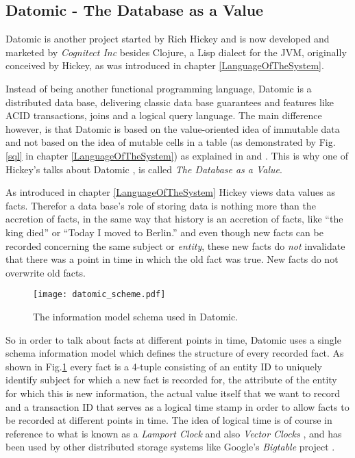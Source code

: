 \subsection{Datomic - The Database as a Value}
\label{datomic}

Datomic \cite{datomic} is another project started by Rich Hickey and is now
developed and marketed by \textit{Cognitect Inc} besides Clojure, a Lisp
dialect for the JVM, originally conceived by Hickey, as was introduced in
chapter \ref{LanguageOfTheSystem}.

Instead of being another functional programming language, Datomic
is a distributed data base, delivering classic data base guarantees and
features like ACID transactions, joins and a logical query language.
The main difference however, is that Datomic is based on the
value-oriented idea of immutable data and not based on the idea of
mutable cells in a table (as demonstrated by Fig.\ref{sql} in
chapter \ref{LanguageOfTheSystem}) as explained in
\cite{datomic-architecture} and \cite{datomic-datamodel}.
This is why one of Hickey's talks about Datomic \cite{datomic-talk1},
\cite{datomic-talk2} is called \textit{The Database as a Value}.

As introduced in chapter \ref{LanguageOfTheSystem} Hickey views
data values as facts. Therefor a data base's role of storing data
is nothing more than the accretion of facts, in the same way
that history is an accretion of facts, like ``the king died'' or
``Today I moved to Berlin.'' and even though new facts can be
recorded concerning the same subject or \textit{entity}, these
new facts do \textit{not} invalidate that there was a point in time
in which the old fact was true. New facts do not overwrite old facts.

\begin{figure}[h]
  \texttt{[image: datomic\_scheme.pdf]}
  \caption{The information model schema used in Datomic.}
  \label{datomic_schema}
\end{figure}

So in order to talk about facts at different points in time, Datomic
uses a single schema information model which defines the structure
of every recorded fact. As shown in Fig.\ref{datomic_schema} every
fact is a 4-tuple consisting of an entity ID to uniquely identify
subject for which a new fact is recorded for, the attribute of
the entity for which this is new information, the actual value itself
that we want to record and a transaction ID that serves as a logical
time stamp in order to allow facts to be recorded at different points
in time. The idea of logical time is of course in reference to what is
known as a \textit{Lamport Clock} \cite{lamportclock} and also
\textit{Vector Clocks} \cite{vectorclock1}, \cite{vectorclock2}
and has been used by other distributed storage systems like
Google's \textit{Bigtable} project \cite{bigtable}.

